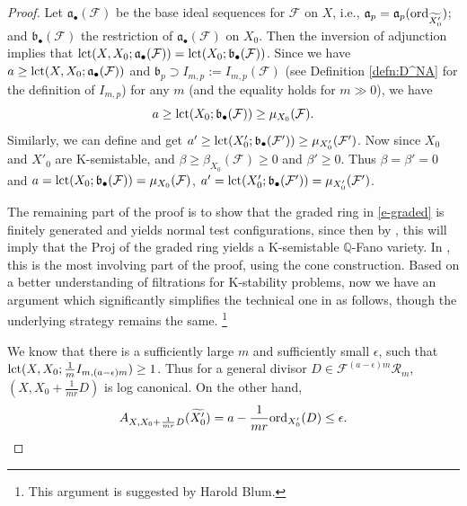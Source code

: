 \documentclass[12pt,reqno]{amsart}%
\newcommand{\cR}{{\mathcal{R}}}
\newcommand{\cF}{\mathcal{F}}
\newcommand{\ord}{{\rm ord}}
\theoremstyle{definition}
\theoremstyle{remark}
\newcommand{\fa}{{\mathfrak{a}}}
\newcommand{\lct}{{\rm lct}}
\newcommand{\fb}{{\mathfrak{b}}}
\begin{document}
\begin{proof}
 
Let $\fa_{\bullet}(\cF)$ be the base ideal sequences for $\cF$ on $X$, i.e., $\fa_{p}=\fa_p(\ord_{\widetilde{X'_0}})$;  and $\fb_{\bullet}(\cF)$ the restriction of $\fa_{\bullet}(\cF)$ on  $X_0$.  Then the inversion of adjunction implies that
$\lct(X,X_0; \fa_{\bullet}(\cF))=\lct(X_0;\fb_{\bullet}(\cF))$. Since we have $a\ge \lct(X,X_0; \fa_{\bullet}(\cF))$ and $\fb_{p}\supset I_{m,p}:=I_{m,p}(\cF)$ (see Definition \ref{defn:D^NA} for the definition of $I_{m,p}$) for any $m$ (and the equality holds for $m\gg 0$), we have
 $$a\ge \lct(X_0;\fb_{\bullet}(\cF))\ge \mu_{X_0}(\cF).$$
 Similarly, we can define  and get $a'\ge \lct(X'_0;\fb_{\bullet}(\cF'))\ge \mu_{X'_0}(\cF')$.  Now since $X_0$ and $X'_0$ are K-semistable, and $\beta\ge \beta_{X_0}(\cF)\ge 0$ and $\beta'\ge 0$. Thus $\beta = \beta'=0$ and $a= \lct(X_0;\fb_{\bullet}(\cF))= \mu_{X_0}(\cF)$, $a'= \lct(X'_0;\fb_{\bullet}(\cF'))= \mu_{X'_0}(\cF')$.

 
 \medskip
 
 
 The remaining part of the proof is to show that the graded ring in \eqref{e-graded} is finitely generated and yields normal test configurations, since then by \cite{LX14}, this will imply that the Proj of the graded ring yields a 
K-semistable $\mathbb{Q}$-Fano variety.  In \cite{BX19}, this is  the most involving part of the proof, using the cone construction.  
Based on a better understanding of filtrations for K-stability problems, %
now we have an argument which significantly simplifies the technical one in \cite{BX19} as follows, though the underlying strategy remains the same. \footnote{This argument is suggested by Harold Blum.}

We know that there is a sufficiently large $m$ and sufficiently small $\epsilon$, such that $\lct(X,X_0;\frac{1}{m}I_{m,(a-\epsilon)m})\ge 1$. Thus for a general divisor $D\in \cF^{(a-\epsilon)m}\cR_m$,  $(X,X_0+\frac{1}{mr}D)$ is log canonical. On the other hand,
$$A_{X,X_0+\frac{1}{mr}D}(\widetilde{X'_0})=a-\frac{1}{mr}\ord_{X_0'}(D)\le \epsilon.$$


\end{proof}
\end{document}
